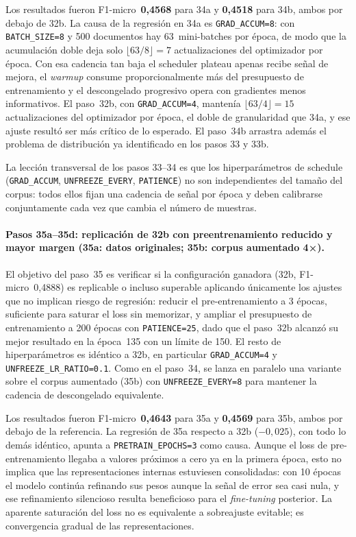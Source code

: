 Los resultados fueron F1-micro~\textbf{0,4568} para 34a y \textbf{0,4518} para 34b, ambos por debajo de 32b. La causa de la regresión en 34a es \texttt{GRAD\_ACCUM=8}: con \texttt{BATCH\_SIZE=8} y 500 documentos hay 63~mini-batches por época, de modo que la acumulación doble deja solo $\lfloor 63/8 \rfloor = 7$ actualizaciones del optimizador por época. Con esa cadencia tan baja el scheduler plateau apenas recibe señal de mejora, el \emph{warmup} consume proporcionalmente más del presupuesto de entrenamiento y el descongelado progresivo opera con gradientes menos informativos. El paso~32b, con \texttt{GRAD\_ACCUM=4}, mantenía $\lfloor 63/4 \rfloor = 15$ actualizaciones del optimizador por época, el doble de granularidad que 34a, y ese ajuste resultó ser más crítico de lo esperado. El paso~34b arrastra además el problema de distribución ya identificado en los pasos 33 y 33b.

\begin{sloppypar}
La lección transversal de los pasos 33--34 es que los hiperparámetros de schedule (\texttt{GRAD\_ACCUM}, \texttt{UNFREEZE\_EVERY}, \texttt{PATIENCE}) no son independientes del tamaño del corpus: todos ellos fijan una cadencia de señal por época y deben calibrarse conjuntamente cada vez que cambia el número de muestras.
\end{sloppypar}

\paragraph{Pasos 35a--35d: replicación de 32b con preentrenamiento reducido y mayor margen (35a: datos originales; 35b: corpus aumentado 4×).}
El objetivo del paso~35 es verificar si la configuración ganadora (32b, F1-micro~0,4888) es replicable o incluso superable aplicando únicamente los ajustes que no implican riesgo de regresión: reducir el pre-entrenamiento a 3 épocas, suficiente para saturar el loss sin memorizar, y ampliar el presupuesto de entrenamiento a 200 épocas con \texttt{PATIENCE=25}, dado que el paso~32b alcanzó su mejor resultado en la época~135 con un límite de 150. El resto de hiperparámetros es idéntico a 32b, en particular \texttt{GRAD\_ACCUM=4} y \texttt{UNFREEZE\_LR\_RATIO=0.1}. Como en el paso~34, se lanza en paralelo una variante sobre el corpus aumentado (35b) con \texttt{UNFREEZE\_EVERY=8} para mantener la cadencia de descongelado equivalente.

Los resultados fueron F1-micro~\textbf{0,4643} para 35a y \textbf{0,4569} para 35b, ambos por debajo de la referencia. La regresión de 35a respecto a 32b ($-0{,}025$), con todo lo demás idéntico, apunta a \texttt{PRETRAIN\_EPOCHS=3} como causa. Aunque el loss de pre-entrenamiento llegaba a valores próximos a cero ya en la primera época, esto no implica que las representaciones internas estuviesen consolidadas: con 10 épocas el modelo continúa refinando sus pesos aunque la señal de error sea casi nula, y ese refinamiento silencioso resulta beneficioso para el \emph{fine-tuning} posterior. La aparente saturación del loss no es equivalente a sobreajuste evitable; es convergencia gradual de las representaciones.

